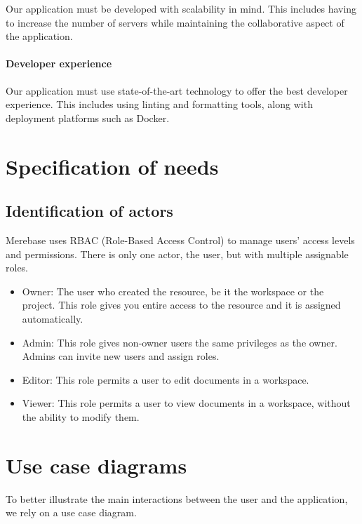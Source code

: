 Our application must be developed with scalability in mind. This includes having to increase the number of servers while maintaining the collaborative aspect of the application.

\paragraph{Developer experience}

Our application must use state-of-the-art technology to offer the best developer experience. This includes using linting and formatting tools, along with deployment platforms such as Docker.

\section{Specification of needs}
\subsection{Identification of actors}

Merebase uses RBAC (Role-Based Access Control) to manage users' access
levels and permissions. There is only one actor, the user, but with
multiple assignable roles.

\begin{itemize}
	\item
	      Owner: The user who created the resource, be it the workspace or the
	      project. This role gives you entire access to the resource and it is
	      assigned automatically.
	\item
	      Admin: This role gives non-owner users the same privileges as the
	      owner. Admins can invite new users and assign roles.
	\item
	      Editor: This role permits a user to edit documents in a workspace.
	\item
	      Viewer: This role permits a user to view documents in a workspace,
	      without the ability to modify them.
\end{itemize}

\section{Use case diagrams}

To better illustrate the main interactions between the user and the
application, we rely on a use case diagram.



